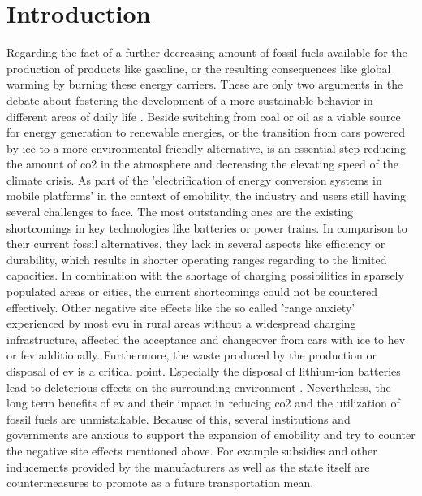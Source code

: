 
\chapter{Introduction}
\label{ch:Introduction}

Regarding the fact of a further decreasing amount of fossil fuels available for the production of products like gasoline, or the resulting consequences like global warming by burning these energy carriers. These are only two arguments in the debate about fostering the development of a more sustainable behavior in different areas of daily life \cite{kathiresh_e-mobility_2022}.
Beside switching from coal or oil as a viable source for energy generation to renewable energies, or the transition from cars powered by \acrfull{ice} to a more environmental friendly alternative, is an essential step reducing the amount of \acrfull{co2} in the atmosphere and decreasing the elevating speed of the climate crisis.
As part of the 'electrification of energy conversion systems in mobile platforms' \cite[165226]{adib_e-mobility_2019} in the context of \acrfull{emobility}, the industry and users still having several challenges to face.
The most outstanding ones are the existing shortcomings in key technologies like batteries or power trains. In comparison to their current fossil alternatives, they lack in several aspects like efficiency or durability, which results in shorter operating ranges regarding to the limited capacities. In combination with the shortage of charging possibilities in sparsely populated areas or cities, the current shortcomings could not be countered effectively.
Other negative site effects like the so called 'range anxiety' \cite{rauh_understanding_2015} experienced by most \acrfull{evu} in rural areas without a widespread charging infrastructure, affected the acceptance and changeover from cars with \acrshort{ice} to \acrfull{hev} or \acrfull{fev} additionally. 
Furthermore, the waste produced by the production or disposal of \acrshort{ev} is a critical point. Especially the disposal of lithium-ion batteries lead to deleterious effects on the surrounding environment \cite{xu_generation_2017}.
Nevertheless, the long term benefits of \acrshort{ev} and their impact in reducing \acrshort{co2} and the utilization of fossil fuels are unmistakable.
Because of this, several institutions and governments are anxious to support the expansion of \acrshort{emobility} and try to counter the negative site effects mentioned above.
For example subsidies and other inducements provided by the manufacturers as well as the state itself are countermeasures to promote  as a future transportation mean.

